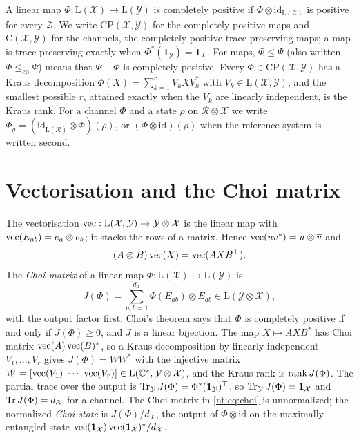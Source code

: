 A linear map $\Phi:\mathrm L(\mathcal X)\to\mathrm L(\mathcal Y)$ is completely positive if $\Phi\otimes\mathrm{id}_{\mathrm L(\mathcal Z)}$ is positive for every $\mathcal Z$. We write $\mathrm{CP}(\mathcal X,\mathcal Y)$ for the completely positive maps and $\mathrm C(\mathcal X,\mathcal Y)$ for the channels, the completely positive trace-preserving maps; a map is trace preserving exactly when $\Phi^*(\mathbf 1_{\mathcal Y})=\mathbf 1_{\mathcal X}$. For maps, $\Phi\le\Psi$ (also written $\Phi\le_{\mathrm{cp}}\Psi$) means that $\Psi-\Phi$ is completely positive. Every $\Phi\in\mathrm{CP}(\mathcal X,\mathcal Y)$ has a Kraus decomposition $\Phi(X)=\sum_{k=1}^rV_kXV_k^*$ with $V_k\in\mathrm L(\mathcal X,\mathcal Y)$, and the smallest possible $r$, attained exactly when the $V_k$ are linearly independent, is the Kraus rank. For a channel $\Phi$ and a state $\rho$ on $\mathcal R\otimes\mathcal X$ we write $\Phi_\rho=(\mathrm{id}_{\mathrm L(\mathcal R)}\otimes\Phi)(\rho)$, or $(\Phi\otimes\mathrm{id})(\rho)$ when the reference system is written second.

\section{Vectorisation and the Choi matrix}\label{nt:sec:choi}

The vectorisation $\operatorname{vec}:\mathrm L(\mathcal X,\mathcal Y)\to\mathcal Y\otimes\mathcal X$ is the linear map with $\operatorname{vec}(E_{ab})=e_a\otimes e_b$; it stacks the rows of a matrix. Hence $\operatorname{vec}(uv^*)=u\otimes\overline v$ and
\[
(A\otimes B)\operatorname{vec}(X)=\operatorname{vec}(AXB^\top).
\]
The \emph{Choi matrix} of a linear map $\Phi:\mathrm L(\mathcal X)\to\mathrm L(\mathcal Y)$ is
\begin{equation}\label{nt:eq:choi}
J(\Phi)=\sum_{a,b=1}^{d_{\mathcal X}}\Phi(E_{ab})\otimes E_{ab}\in\mathrm L(\mathcal Y\otimes\mathcal X),
\end{equation}
with the output factor first. Choi's theorem \cite{Choi1975} says that $\Phi$ is completely positive if and only if $J(\Phi)\ge0$, and $J$ is a linear bijection. The map $X\mapsto AXB^*$ has Choi matrix $\operatorname{vec}(A)\operatorname{vec}(B)^*$, so a Kraus decomposition by linearly independent $V_1,\dots,V_r$ gives $J(\Phi)=WW^*$ with the injective matrix $W=[\vectorise(V_1)\ \cdots\ \vectorise(V_r)]\in\mathrm L(\mathbb C^r,\mathcal Y\otimes\mathcal X)$, and the Kraus rank is $\operatorname{rank} J(\Phi)$. The partial trace over the output is $\operatorname{Tr}_{\mathcal Y}J(\Phi)=\Phi^*(\mathbf 1_{\mathcal Y})^\top$, so $\operatorname{Tr}_{\mathcal Y}J(\Phi)=\mathbf 1_{\mathcal X}$ and $\operatorname{Tr} J(\Phi)=d_{\mathcal X}$ for a channel. The Choi matrix in \eqref{nt:eq:choi} is unnormalized; the normalized \emph{Choi state} is $J(\Phi)/d_{\mathcal X}$, the output of $\Phi\otimes\mathrm{id}$ on the maximally entangled state $\operatorname{vec}(\mathbf 1_{\mathcal X})\operatorname{vec}(\mathbf 1_{\mathcal X})^*/d_{\mathcal X}$.

